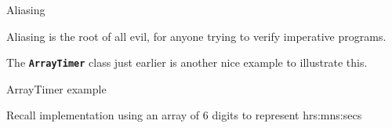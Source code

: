\documentclass[
pdf,
nocolorBG,
slideColor,
erik,
]{prosper}
\newcommand{\code}[1]{{\rm \texttt{\textbf{\small #1}}}}
\begin{document}
\begin{slide}{Aliasing}
\vspace*{-4ex}

Aliasing is the root of all evil, for anyone trying to verify 
imperative programs.

\medskip

The \code{ArrayTimer} class just earlier is another nice example
to illustrate this.

\end{slide}


\begin{slide}{ArrayTimer example}
\vspace*{-4ex}

Recall implementation using an array of 6 digits to represent
hrs:mns:secs


\end{slide}
\end{document}

